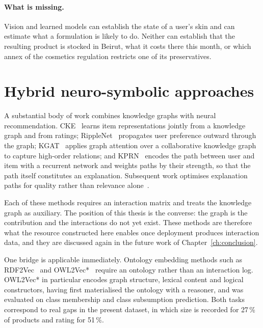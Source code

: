 \paragraph{What is missing.} Vision and learned models can establish the state
of a user's skin and can estimate what a formulation is likely to do. Neither
can establish that the resulting product is stocked in Beirut, what it costs
there this month, or which annex of the cosmetics regulation restricts one of
its preservatives.

\section{Hybrid neuro-symbolic approaches}
\label{sec:rw-hybrid}

A substantial body of work combines knowledge graphs with neural
recommendation. CKE~\cite{zhang2016cke} learns item representations jointly from
a knowledge graph and from ratings; RippleNet~\cite{wang2018ripplenet} propagates
user preference outward through the graph; KGAT~\cite{wang2019kgat} applies graph
attention over a collaborative knowledge graph to capture high-order relations;
and KPRN~\cite{wang2019kprn} encodes the path between user and item with a
recurrent network and weights paths by their strength, so that the path itself
constitutes an explanation. Subsequent work optimises explanation paths for
quality rather than relevance alone~\cite{balloccu2022}.

Each of these methods requires an interaction matrix and treats the knowledge
graph as auxiliary. The position of this thesis is the converse: the graph is
the contribution and the interactions do not yet exist. These methods are
therefore what the resource constructed here enables once deployment produces
interaction data, and they are discussed again in the future work of
Chapter~\ref{ch:conclusion}.


One bridge is applicable immediately. Ontology embedding methods such as
RDF2Vec~\cite{ristoski2016rdf2vec} and OWL2Vec*~\cite{chen2021owl2vec} require an
ontology rather than an interaction log. OWL2Vec* in particular encodes graph
structure, lexical content and logical constructors, having first materialised
the ontology with a reasoner, and was evaluated on class membership and class
subsumption prediction. Both tasks correspond to real gaps in the present
dataset, in which size is recorded for 27\,\% of products and rating for 51\,\%.

